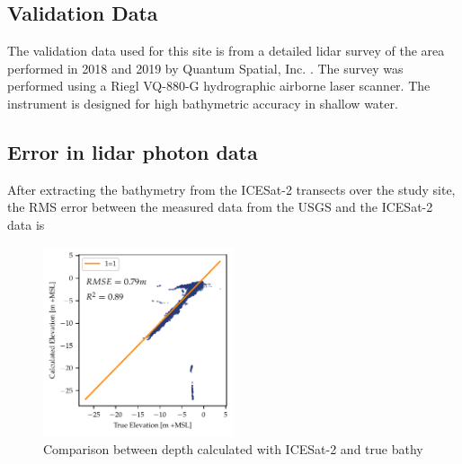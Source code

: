 \subsection{Validation Data}
The validation data used for this site is from a detailed lidar survey of the area performed in 2018 and 2019 by Quantum Spatial, Inc. \parencite{Keys2019Lidar}. The survey was performed using a Riegl VQ-880-G hydrographic airborne laser scanner. The instrument is designed for high bathymetric accuracy in shallow water.
\subsection{Error in lidar photon data}
After extracting the bathymetry from the ICESat-2 transects over the study site, the RMS error between the measured data from the USGS and the ICESat-2 data is
\begin{figure}[h]
    \centering
    \includegraphics[width=0.5\textwidth]{figures/florida_keys_lidar_estimated_vs_truth.pdf}
    \caption{Comparison between depth calculated with ICESat-2 and true bathy}
    \label{fig:fl_truth_vs_measured_points}
\end{figure}
% 

% 

